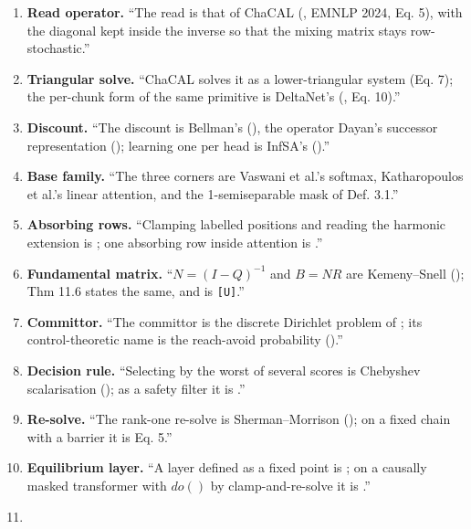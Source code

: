 \documentclass[11pt,a4paper]{article}
\theoremstyle{plain}
\theoremstyle{definition}
\theoremstyle{remark}
\providecommand{\tightlist}{%
  \setlength{\itemsep}{0pt}\setlength{\parskip}{0pt}}
\begin{document}
\begin{enumerate}
\def\labelenumi{\arabic{enumi}.}
\tightlist
\item
  \textbf{Read operator.} ``The read is that of ChaCAL
  (\citep{fagnou-2024-chacal}, EMNLP 2024, Eq. 5), with the diagonal
  kept inside the inverse so that the mixing matrix stays
  row-stochastic.''
\item
  \textbf{Triangular solve.} ``ChaCAL solves it as a lower-triangular
  system (Eq. 7); the per-chunk form of the same primitive is DeltaNet's
  (\citep{yang-2024-deltanet}, Eq. 10).''
\item
  \textbf{Discount.} ``The discount is Bellman's
  (\citep{bellman-1957-markovian}), the operator Dayan's successor
  representation (\citep{dayan-1993-successor}); learning one per head
  is InfSA's (\citep{roffo-2026-infsa}).''
\item
  \textbf{Base family.} ``The three corners are Vaswani et al.'s
  softmax, Katharopoulos et al.'s linear attention, and the
  1-semiseparable mask of \citep{dao-2024-ssd} Def. 3.1.''
\item
  \textbf{Absorbing rows.} ``Clamping labelled positions and reading the
  harmonic extension is \citep{zhu-2003-harmonic}; one absorbing row
  inside attention is \citep{karbalayghareh-2026-doformer}.''
\item
  \textbf{Fundamental matrix.} ``\(N=(I-Q)^{-1}\) and \(B=NR\) are
  Kemeny--Snell (\citep{kemeny-1960-finitemarkov});
  \citep{grinstead-1997-probability} Thm 11.6 states the same, and is
  \texttt{{[}U{]}}.''
\item
  \textbf{Committor.} ``The committor is the discrete Dirichlet problem
  of \citep{metzner-2009-tpt-markov-jump}; its control-theoretic name is
  the reach-avoid probability (\citep{summers-2010-reach-avoid}).''
\item
  \textbf{Decision rule.} ``Selecting by the worst of several scores is
  Chebyshev scalarisation (\citep{vanmoffaert-2013-chebyshev}); as a
  safety filter it is \citep{hsu-2023-safetyfilter}.''
\item
  \textbf{Re-solve.} ``The rank-one re-solve is Sherman--Morrison
  (\citep{sherman-1950-inverse-adjustment}); on a fixed chain with a
  barrier it is \citep{piray-2021-linearrl} Eq. 5.''
\item
  \textbf{Equilibrium layer.} ``A layer defined as a fixed point is
  \citep{bai-2019-deq}; on a causally masked transformer with \(do()\)
  by clamp-and-re-solve it is \citep{scetbon-2024-fip}.''
\item

\end{enumerate}
\end{document}
